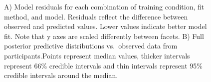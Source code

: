 \documentclass[
  letterpaper,
  DIV=11,
  numbers=noendperiod,
  oneside]{scrartcl}
\begin{document}
\begin{figure}


\caption{\label{fig-htw-resid-pred}A) Model residuals for each
combination of training condition, fit method, and model. Residuals
reflect the difference between observed and predicted values. Lower
values indicate better model fit. Note that y axes are scaled
differently between facets. B) Full posterior predictive distributions
vs.~observed data from participants.Points represent median values,
thicker intervals represent 66\% credible intervals and thin intervals
represent 95\% credible intervals around the median.}

\end{figure}%
\end{document}
